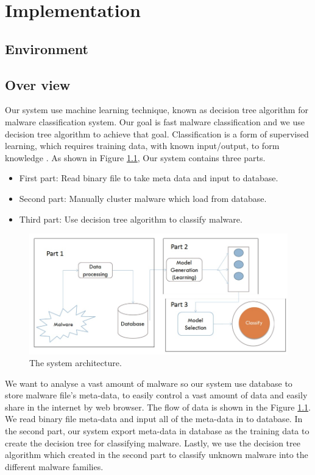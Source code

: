 \chapter{Implementation}\label{chap:5}
%
%
\section{Environment}
\section{Over view}
Our system use machine learning technique, known as decision tree algorithm for malware classification system. Our goal is fast malware classification and we use decision tree algorithm to achieve that goal. Classification is a form of supervised learning, which requires training data, with known input/output, to form knowledge \cite{tonylee}. As shown in Figure \ref{fig:system_architec}, Our system contains three parts.\\
\begin{itemize}
\item First part: Read binary file to take meta data and input to database.\\
\item Second part: Manually cluster malware which load from database.\\
\item Third part: Use decision tree algorithm to classify malware.\\
\end{itemize}
\begin{figure}[h!]
\centering
\includegraphics[width=1\textwidth]
{graph/system_architec1.jpg}
\caption{The system architecture.}
\label{fig:system_architec}
\end{figure}
We want to analyse a vast amount of malware so our system use database to store malware file's meta-data, to easily control a vast amount of data and easily share in the internet by web browser.
The flow of data is shown in the Figure \ref{fig:system_architec}. We read binary file meta-data and input all of the meta-data in to database. In the second part, our system export meta-data in database as the training data to create the decision tree for classifying malware. Lastly, we use the decision tree algorithm which created in the second part to classify unknown malware into the different malware families. 
%
%

